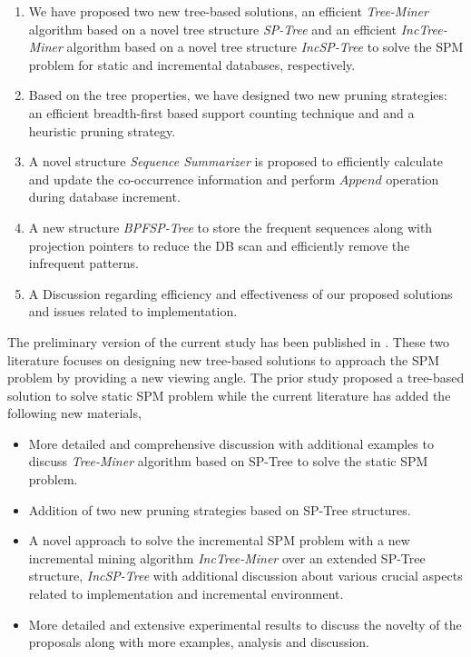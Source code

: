 \begin{enumerate}
    \item We have proposed two new tree-based solutions, an efficient \textit{Tree-Miner} algorithm based on a novel tree structure \textit{SP-Tree} and an efficient \textit{IncTree-Miner} algorithm based on a novel tree structure \textit{IncSP-Tree} to solve the SPM problem for static and incremental databases, respectively.
    \item Based on the tree properties, we have designed two new pruning strategies: an efficient breadth-first based support counting technique and and a heuristic pruning strategy.
    \item A novel structure \textit{Sequence Summarizer} is proposed to efficiently calculate and update the co-occurrence information and perform $Append$ operation during database increment.
    \item A new structure \textit{BPFSP-Tree} to store the frequent sequences along with projection pointers to reduce the DB scan and efficiently remove the infrequent patterns.
    \item A Discussion regarding efficiency and effectiveness of our proposed solutions and issues related to implementation.
\end{enumerate}

The preliminary version of the current study has been published in \cite{rizvee2020tree}. These two literature focuses on designing new tree-based solutions to approach the SPM problem by providing a new viewing angle. The prior study proposed a tree-based solution to solve static SPM problem while the current literature has added the following new materials,

\begin{itemize}
    \item More detailed and comprehensive discussion with additional examples to discuss \textit{Tree-Miner} algorithm based on SP-Tree to solve the static SPM problem.
    \item Addition of two new pruning strategies based on SP-Tree structures.
    \item A novel approach to solve the incremental SPM problem with a new incremental mining algorithm \textit{IncTree-Miner} over an extended SP-Tree structure, \textit{IncSP-Tree} with additional discussion about various crucial aspects related to implementation and incremental environment.
    \item More detailed and extensive experimental results to discuss the novelty of the proposals along with more examples, analysis and discussion.
\end{itemize}

